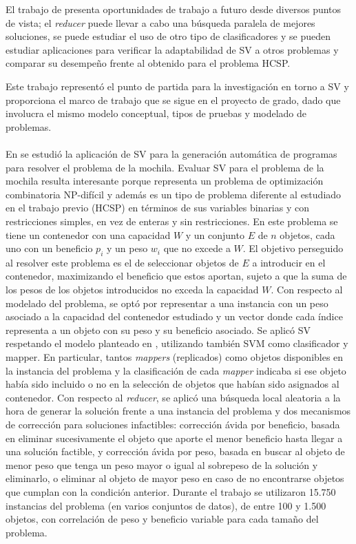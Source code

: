 El trabajo de \citet{savant-original} presenta oportunidades de trabajo a futuro desde diversos puntos de vista; el \textit{reducer} puede llevar a cabo una búsqueda paralela de mejores soluciones, se puede estudiar el uso de otro tipo de clasificadores y se pueden estudiar aplicaciones para verificar la adaptabilidad de SV a otros problemas y comparar su desempeño frente al obtenido para el problema HCSP. 

Este trabajo representó el punto de partida para la investigación en torno a SV y proporciona el marco de trabajo que se sigue en el proyecto de grado, dado que involucra el mismo modelo conceptual, tipos de pruebas y modelado de problemas.

\paragraph{}En \citet{savant-bag} se estudió la aplicación de SV para la generación automática de programas para resolver el problema de la mochila.
Evaluar SV para el problema de la mochila resulta interesante porque representa un problema de optimización combinatoria NP-difícil y además es un tipo de problema diferente al estudiado en el trabajo previo (HCSP) en términos de sus variables binarias y con restricciones simples, en vez de enteras y sin restricciones.
En este problema se tiene un contenedor con una capacidad $W$ y un conjunto $E$ de $n$ objetos, cada uno con un beneficio $p_i$ y un peso $w_i$ que no excede a $W$. El objetivo perseguido al resolver este problema es el de seleccionar objetos de $E$ a introducir en el contenedor, maximizando el beneficio que estos aportan, sujeto a que la suma de los pesos de los objetos introducidos no exceda la capacidad $W$. Con respecto al modelado del problema, se optó por representar a una instancia con un peso asociado a la capacidad del contenedor estudiado y un vector donde cada índice representa a un objeto con su peso y su beneficio asociado.
Se aplicó SV respetando el modelo planteado en \citet{savant-original}, utilizando también SVM como clasificador y mapper. En particular, tantos \textit{mappers} (replicados) como objetos disponibles en la instancia del problema y la clasificación de cada \textit{mapper} indicaba si ese objeto había sido incluido o no en la selección de objetos que habían sido asignados al contenedor. Con respecto al \textit{reducer}, se aplicó una búsqueda local aleatoria a la hora de generar la solución frente a una instancia del problema y dos mecanismos de corrección para soluciones infactibles: corrección ávida por beneficio, basada en eliminar sucesivamente el objeto que aporte el menor beneficio hasta llegar a una solución factible, y corrección ávida por peso, basada en buscar al objeto de menor peso que tenga un peso mayor o igual al sobrepeso de la solución y eliminarlo, o eliminar al objeto de mayor peso en caso de no encontrarse objetos que cumplan con la condición anterior. Durante el trabajo se utilizaron 15.750 instancias del problema (en varios conjuntos de datos), de entre 100 y 1.500 objetos, con correlación de peso y beneficio variable para cada tamaño del problema.

